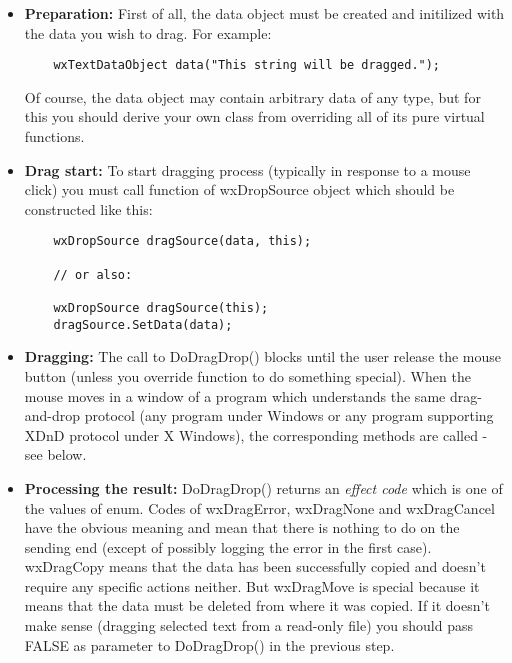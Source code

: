 \begin{itemize}\itemsep=0pt
\item {\bf Preparation:} First of all, the data object must be created and
initilized with the data you wish to drag. For example:

\begin{verbatim}
	wxTextDataObject data("This string will be dragged.");
\end{verbatim}

Of course, the data object may contain arbitrary data of any type, but for
this you should derive your own class from 
 overriding all of its pure virtual
functions.

\item{\bf Drag start:} To start dragging process (typically in response to a
mouse click) you must call 
function of wxDropSource object which should be constructed like this:

\begin{verbatim}
	wxDropSource dragSource(data, this);

	// or also:

	wxDropSource dragSource(this);
	dragSource.SetData(data);
\end{verbatim}

\item {\bf Dragging:} The call to DoDragDrop() blocks until the user release the
mouse button (unless you override  function
to do something special). When the mouse moves in a window of a program which understands the
same drag-and-drop protocol (any program under Windows or any program supporting XDnD protocol
under X Windows), the corresponding  methods
are called - see below.

\item {\bf Processing the result:} DoDragDrop() returns an {\it effect code}
which is one of the values of  enum. Codes
of wxDragError, wxDragNone and wxDragCancel have the obvious meaning and mean
that there is nothing to do on the sending end (except of possibly logging the
error in the first case). wxDragCopy means that the data has been successfully
copied and doesn't require any specific actions neither. But wxDragMove is
special because it means that the data must be deleted from where it was
copied. If it doesn't make sense (dragging selected text from a read-only
file) you should pass FALSE as parameter to DoDragDrop() in the previous step.

\end{itemize}


